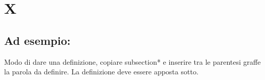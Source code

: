\section*{X}
\markright{}

\subsection*{Ad esempio:}
Modo di dare una definizione, copiare subsection*{} e inserire tra le parentesi graffe la parola da definire. La definizione deve essere apposta sotto.